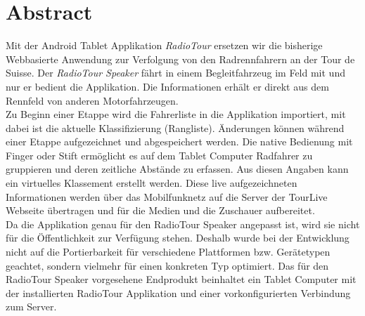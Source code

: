 \chapter*{Abstract}

Mit der Android Tablet Applikation \textit{RadioTour} ersetzen wir die bisherige Webbasierte Anwendung zur Verfolgung von den Radrennfahrern an der Tour de Suisse. Der \textit{RadioTour Speaker} fährt in einem Begleitfahrzeug im Feld mit und nur er bedient die Applikation. Die Informationen erhält er direkt aus dem Rennfeld von anderen Motorfahrzeugen.
\\
Zu Beginn einer Etappe wird die Fahrerliste in die Applikation importiert, mit dabei ist die aktuelle Klassifizierung (Rangliste). Änderungen können während einer Etappe aufgezeichnet und abgespeichert werden. Die native Bedienung mit Finger oder Stift ermöglicht es auf dem Tablet Computer Radfahrer zu gruppieren und deren zeitliche Abstände zu erfassen. Aus diesen Angaben kann ein virtuelles Klassement erstellt werden. Diese live aufgezeichneten Informationen werden über das Mobilfunknetz auf die Server der TourLive Webseite übertragen und für die Medien und die Zuschauer aufbereitet.
\\
Da die Applikation genau für den RadioTour Speaker angepasst ist, wird sie nicht für die Öffentlichkeit zur Verfügung stehen. Deshalb wurde bei der Entwicklung nicht auf die Portierbarkeit für verschiedene Plattformen bzw. Gerätetypen geachtet, sondern vielmehr für einen konkreten Typ optimiert. Das für den RadioTour Speaker vorgesehene Endprodukt beinhaltet ein Tablet Computer mit der installierten RadioTour Applikation und einer vorkonfigurierten Verbindung zum Server.
